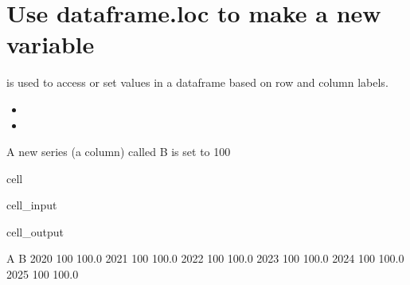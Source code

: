 \documentclass[letterpaper,10pt,english]{jupyterBook}
\begin{document}
\section{Use dataframe.loc to make a new variable}
\label{\detokenize{content/howto/update/model update:use-dataframe-loc-to-make-a-new-variable}}
\sphinxAtStartPar
{} is used to access or set values in a dataframe based on row and column labels.
\begin{itemize}
\item {} 
\sphinxAtStartPar
{}

\item {} 
\sphinxAtStartPar
{}

\end{itemize}

\sphinxAtStartPar
A new series (a column) called B is set to 100

\begin{sphinxuseclass}{cell}\begin{sphinxVerbatimInput}

\begin{sphinxuseclass}{cell_input}
\begin{sphinxVerbatim}[commandchars=\\\{\}]
\PYG{p}{[} \PYG{p}{]}  
\end{sphinxVerbatim}

\end{sphinxuseclass}\end{sphinxVerbatimInput}
\begin{sphinxVerbatimOutput}

\begin{sphinxuseclass}{cell_output}
\begin{sphinxVerbatim}[commandchars=\\\{\}]
        A      B
2020  100  100.0
2021  100  100.0
2022  100  100.0
2023  100  100.0
2024  100  100.0
2025  100  100.0
\end{sphinxVerbatim}

\end{sphinxuseclass}\end{sphinxVerbatimOutput}

\end{sphinxuseclass}
\end{document}
